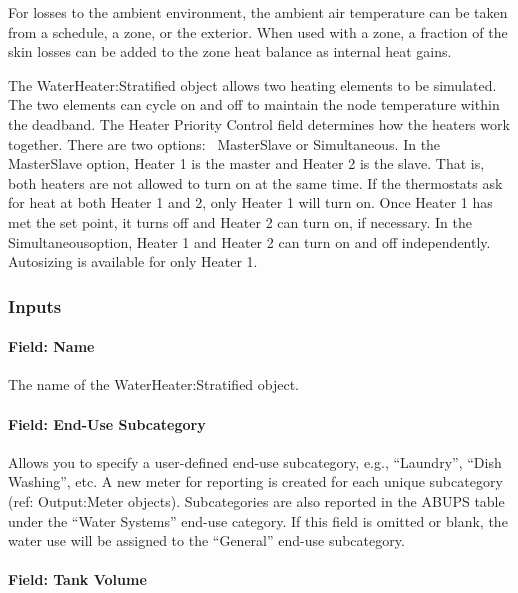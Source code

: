 For losses to the ambient environment, the ambient air temperature can be taken from a schedule, a zone, or the exterior. When used with a zone, a fraction of the skin losses can be added to the zone heat balance as internal heat gains.

The WaterHeater:Stratified object allows two heating elements to be simulated. The two elements can cycle on and off to maintain the node temperature within the deadband. The Heater Priority Control field determines how the heaters work together. There are two options:~ MasterSlave or Simultaneous. In the MasterSlave option, Heater 1 is the master and Heater 2 is the slave. That is, both heaters are not allowed to turn on at the same time. If the thermostats ask for heat at both Heater 1 and 2, only Heater 1 will turn on. Once Heater 1 has met the set point, it turns off and Heater 2 can turn on, if necessary. In the Simultaneousoption, Heater 1 and Heater 2 can turn on and off independently.~ Autosizing is available for only Heater 1.

\subsubsection{Inputs}\label{inputs-1-049}

\paragraph{Field: Name}\label{field-name-1-047}

The name of the WaterHeater:Stratified object.

\paragraph{Field: End-Use Subcategory}\label{field-end-use-subcategory-004}

Allows you to specify a user-defined end-use subcategory, e.g., ``Laundry'', ``Dish Washing'', etc. A new meter for reporting is created for each unique subcategory~ (ref: Output:Meter objects). Subcategories are also reported in the ABUPS table under the ``Water Systems'' end-use category. If this field is omitted or blank, the water use will be assigned to the ``General'' end-use subcategory.

\paragraph{Field: Tank Volume}\label{field-tank-volume-1-000}

